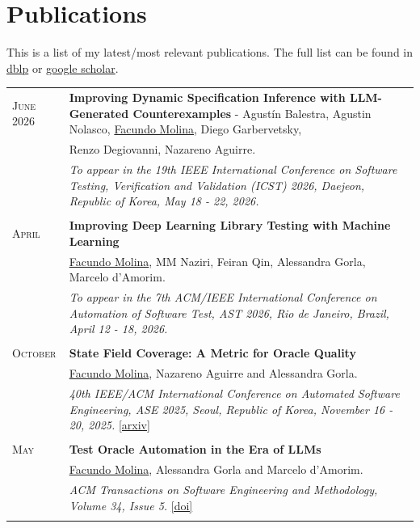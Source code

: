 \documentclass[a4paper,10pt]{article} %
\begin{document}
\section{Publications}

{\raggedleft
This is a list of my latest/most relevant publications. The full list can be found in \href{https://dblp.org/pid/189/6361.html}{dblp} or \href{https://scholar.google.com/citations?user=_8J_7doAAAAJ}{google scholar}.} \\

\begin{longtable}{>{\raggedleft\arraybackslash}p{} p{}}

\textsc{June} 2026 & \textbf{Improving Dynamic Specification Inference with LLM-Generated Counterexamples} - Agustín Balestra, Agustin Nolasco, \underline{Facundo Molina}, Diego Garbervetsky,  \\
        & Renzo Degiovanni, Nazareno Aguirre. \\
        & \textit{To appear in the 19th IEEE International Conference on Software Testing, Verification and Validation (ICST) 2026, Daejeon, Republic of Korea, May 18 - 22, 2026.} \\ & \\

\textsc{April}  & \textbf{Improving Deep Learning Library Testing with Machine Learning} \\
        2026 & \underline{Facundo Molina}, MM Naziri, Feiran Qin, Alessandra Gorla, Marcelo d'Amorim. \\
        & \textit{To appear in the 7th ACM/IEEE International Conference on Automation of Software Test, AST 2026, Rio de Janeiro, Brazil, April 12 - 18, 2026.} \\ & \\

\textsc{October}  & \textbf{State Field Coverage: A Metric for Oracle Quality} \\
        2025 & \underline{Facundo Molina}, Nazareno Aguirre and Alessandra Gorla. \\
        & \textit{40th IEEE/ACM International Conference on Automated Software Engineering, ASE 2025, Seoul, Republic of Korea, November 16 - 20, 2025.} \href{https://arxiv.org/pdf/2510.03071}{[arxiv]} \\ & \\

\textsc{May}  & \textbf{Test Oracle Automation in the Era of LLMs} \\
        2025 & \underline{Facundo Molina}, Alessandra Gorla and Marcelo d'Amorim. \\
        & \textit{ACM Transactions on Software Engineering and Methodology, Volume 34, Issue 5.} \href{https://doi.org/10.1145/3715107}{[doi]} \\ & \\


\end{longtable}
\end{document}
